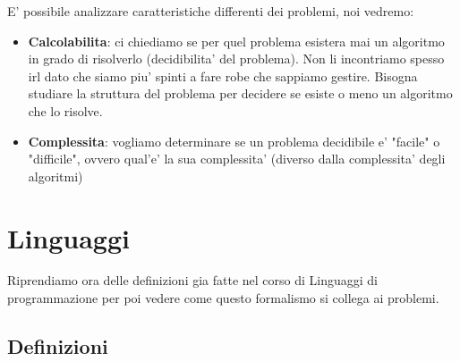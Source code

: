 
E' possibile analizzare caratteristiche differenti dei problemi, noi vedremo:
\begin{itemize}
  \item \textbf{Calcolabilita}: ci chiediamo se per quel problema esistera mai un algoritmo in grado di risolverlo (decidibilita' del problema). Non li incontriamo spesso irl dato che siamo piu' spinti a fare robe che sappiamo gestire. Bisogna studiare la struttura del problema per decidere se esiste o meno un algoritmo che lo risolve.
  \item \textbf{Complessita}: vogliamo determinare se un problema decidibile e' "facile" o "difficile", ovvero qual'e' la sua complessita' (diverso dalla complessita' degli algoritmi)
\end{itemize}


\section{Linguaggi}

Riprendiamo ora delle definizioni gia fatte nel corso di Linguaggi di programmazione per poi vedere come questo formalismo si collega ai problemi.

\subsection{Definizioni}






